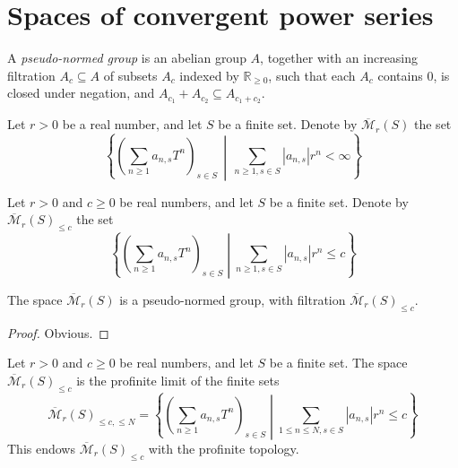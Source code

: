 \section{Spaces of convergent power series}

\begin{definition}
  \label{pseudo_normed_group}
  \leanok
  A \emph{pseudo-normed group} is an abelian group $A$,
  together with an increasing filtration $A_c \subseteq A$ of subsets $A_c$ indexed by $\mathbb R_{\ge 0}$,
  such that each $A_c$ contains $0$, is closed under negation,
  and $A_{c_1} + A_{c_2} \subseteq A_{c_1 + c_2}$.
\end{definition}

\begin{definition}
  \label{Mbar}
  \leanok
  Let $r > 0$ be a real number, and let $S$ be a finite set.
  Denote by $\overline{\mathcal M}_r(S)$ the set
  \[
    \left\{ \left( \sum_{n \ge 1} a_{n,s} T^n \right)_{s \in S} \,\middle\vert\, \sum_{n \ge 1, s \in S} |a_{n,s}| r^n < \infty \right\}
  \]
\end{definition}

\begin{definition}
  \label{Mbar_le}
  \leanok
  Let $r > 0$ and $c \ge 0$ be real numbers, and let $S$ be a finite set.
  Denote by $\overline{\mathcal M}_r(S)_{\le c}$ the set
  \[
    \left\{ \left( \sum_{n \ge 1} a_{n,s} T^n \right)_{s \in S} \middle\vert \sum_{n \ge 1, s \in S} |a_{n,s}| r^n \le c \right\}
  \]
\end{definition}

\begin{lemma}
  \label{Mbar_png}
  \leanok
  The space $\overline{\mathcal M}_r(S)$ is a pseudo-normed group,
  with filtration $\overline{\mathcal M}_r(S)_{\le c}$.
\end{lemma}

\begin{proof}
  \leanok
  Obvious.
\end{proof}

\begin{lemma}
  \label{Mbar_le_profinite}
  \leanok
  Let $r > 0$ and $c \ge 0$ be real numbers, and let $S$ be a finite set.
  The space $\overline{\mathcal M}_r(S)_{\le c}$ is the profinite limit of the finite sets
  \[
    \overline{\mathcal M}_r(S)_{\le c, \le N} =
    \left\{ \left( \sum_{n \ge 1} a_{n,s} T^n \right)_{s \in S} \middle\vert
    \sum_{1 \le n \le N, s \in S} |a_{n,s}| r^n \le c \right\}
  \]
  This endows $\overline{\mathcal M}_r(S)_{\le c}$ with the profinite topology.
\end{lemma}

